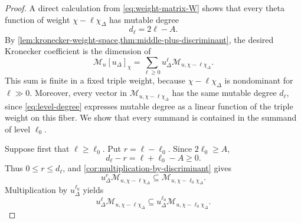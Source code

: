 \documentclass[11pt,reqno]{amsart}
\numberwithin{equation}{section}
\theoremstyle{remark}
\newcommand{\Mu}{\mathcal M_u}
\newcommand{\Muwt}[1]{\mathcal M_{u,#1}}
\newcommand{\udisc}{u_{\Delta}}
\begin{document}
\begin{proof}
A direct calculation from \eqref{eq:weight-matrix-W} shows that every theta
function of weight $\chi-\ell\chi_\Delta$ has mutable degree
\begin{equation}
\label{eq:level-degree}
 d_\ell=2\ell-A.
\end{equation}
By \cref{lem:kronecker-weight-space,thm:middle-plus-discriminant}, the desired
Kronecker coefficient is the dimension of
\[ \Mu[\udisc]_\chi =\sum_{\ell\ge0}\udisc^\ell \Muwt{\chi-\ell\chi_\Delta}. \]
This sum is finite in a fixed triple weight, because
$\chi-\ell\chi_\Delta$ is nondominant for $\ell\gg0$.  Moreover, every
vector in $\Muwt{\chi-\ell\chi_\Delta}$ has the same mutable degree
$d_\ell$, since \eqref{eq:level-degree} expresses mutable degree as a
linear function of the triple weight on this fiber.  We show that every
summand is contained in the summand of level $\ell_0$.



Suppose first that $\ell\ge\ell_0$. Put $r=\ell-\ell_0$. Since $2\ell_0\ge A$,
\[ d_\ell-r=\ell+\ell_0-A\ge0. \]
Thus $0\le r\le d_\ell$, and
\cref{cor:multiplication-by-discriminant} gives
\[ \udisc^r\Muwt{\chi-\ell\chi_\Delta} \subseteq\Muwt{\chi-\ell_0\chi_\Delta}. \]
Multiplication by $\udisc^{\ell_0}$ yields
\begin{equation}
\label{eq:high-level-reduction}
 \udisc^\ell\Muwt{\chi-\ell\chi_\Delta}
 \subseteq
 \udisc^{\ell_0}\Muwt{\chi-\ell_0\chi_\Delta}.
\end{equation}


\end{proof}
\end{document}
